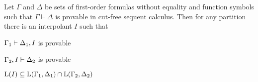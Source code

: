 

\begin{lemma}[Maehara]
	\label{lemma:maehara}
	Let $\Gamma$ and $\Delta$ be sets of first-order formulas without equality and function symbols such that $\Gamma \vdash \Delta$ is provable in cut-free sequent calculus.
	Then for any partition 
	there is an interpolant $I$ such that
	\begin{compactenum}
	\item $\Gamma_1 \vdash \Delta_1, I$ is provable 
		\label{maehcond1}
	\item $\Gamma_2, I \vdash \Delta_2$ is provable 
		\label{maehcond2}
	\item $\operatorname{L}(I) \subseteq \operatorname{L}(\Gamma_1, \Delta_1) \cap \operatorname{L}(\Gamma_2, \Delta_2)$
		\label{maehcond3}
	\end{compactenum}
\end{lemma}
